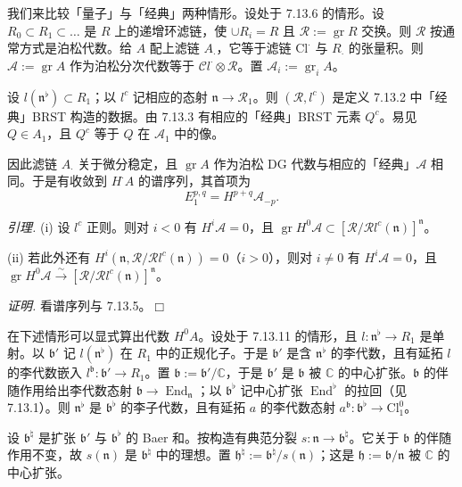  我们来比较「量子」与「经典」两种情形。设处于 7.13.6 的情形。设 $R_0\subset R_1\subset\ldots$ 是 $R$ 上的递增环滤链，使 $\cup R_i=R$ 且 $\mathcal{R}:=\operatorname{gr}R$ 交换。则 $\mathcal{R}$ 按通常方式是泊松代数。给 $A$ 配上滤链 $A_{\cdot}$，它等于滤链 $\mathrm{Cl}^{\cdot}$ 与 $R_{\cdot}$ 的张量积。则 $\mathcal{A}:=\operatorname{gr}A$ 作为泊松分次代数等于 $\mathcal{C}l^{\cdot}\otimes\mathcal{R}$。置 $\mathcal{A}_i:=\operatorname{gr}_iA$。

设 $l(\mathfrak{n}^{\flat})\subset R_1$；以 $l^{c}$ 记相应的态射 $\mathfrak{n}\to\mathcal{R}_1$。则 $(\mathcal{R},l^{c})$ 是定义 7.13.2 中「经典」BRST 构造的数据。由 7.13.3 有相应的「经典」BRST 元素 $Q^{c}$。易见 $Q\in A_1$，且 $Q^{c}$ 等于 $Q$ 在 $\mathcal{A}_1$ 中的像。


因此滤链 $A_{\cdot}$ 关于微分稳定，且 $\operatorname{gr}A$ 作为泊松 DG 代数与相应的「经典」$\mathcal{A}$ 相同。于是有收敛到 $H^{\cdot}A$ 的谱序列，其首项为
\[
E^{p,q}_1=H^{p+q}\mathcal{A}_{-p}.
\]

 \emph{引理.} (i) 设 $l^{c}$ 正则。则对 $i<0$ 有 $H^{i}\mathcal{A}=0$，且 $\operatorname{gr}H^{0}\mathcal{A}\subset[\mathcal{R}/\mathcal{R}l^{c}(\mathfrak{n})]^{\mathfrak{n}}$。

(ii) 若此外还有 $H^{i}(\mathfrak{n},\mathcal{R}/\mathcal{R}l^{c}(\mathfrak{n}))=0$（$i>0$），则对 $i\ne0$ 有 $H^{i}\mathcal{A}=0$，且 $\operatorname{gr}H^{0}\mathcal{A}\xrightarrow{\sim}[\mathcal{R}/\mathcal{R}l^{c}(\mathfrak{n})]^{\mathfrak{n}}$。

\emph{证明.} 看谱序列与 7.13.5。\hfill$\Box$

 在下述情形可以显式算出代数 $H^{0}A$。设处于 7.13.11 的情形，且 $l:\mathfrak{n}^{\flat}\to R_1$ 是单射。以 $\mathfrak{b}'$ 记 $l(\mathfrak{n}^{\flat})$ 在 $R_1$ 中的正规化子。于是 $\mathfrak{b}'$ 是含 $\mathfrak{n}^{\flat}$ 的李代数，且有延拓 $l$ 的李代数嵌入 $l^{\mathfrak{b}}:\mathfrak{b}'\to R_1$。置 $\mathfrak{b}:=\mathfrak{b}'/\mathbb{C}$，于是 $\mathfrak{b}'$ 是 $\mathfrak{b}$ 被 $\mathbb{C}$ 的中心扩张。$\mathfrak{b}$ 的伴随作用给出李代数态射 $\mathfrak{b}\to\operatorname{End}_{\mathfrak{n}}$；以 $\mathfrak{b}^{\flat}$ 记中心扩张 $\operatorname{End}^{\flat}$ 的拉回（见 7.13.1）。则 $\mathfrak{n}^{\flat}$ 是 $\mathfrak{b}^{\flat}$ 的李子代数，且有延拓 $a$ 的李代数态射 $a^{\mathfrak{b}}:\mathfrak{b}^{\flat}\to\mathrm{Cl}^{0}_1$。

设 $\mathfrak{b}^{\natural}$ 是扩张 $\mathfrak{b}'$ 与 $\mathfrak{b}^{\flat}$ 的 Baer 和。按构造有典范分裂 $s:\mathfrak{n}\to\mathfrak{b}^{\natural}$。它关于 $\mathfrak{b}$ 的伴随作用不变，故 $s(\mathfrak{n})$ 是 $\mathfrak{b}^{\natural}$ 中的理想。置 $\mathfrak{h}^{\natural}:=\mathfrak{b}^{\natural}/s(\mathfrak{n})$；这是 $\mathfrak{h}:=\mathfrak{b}/\mathfrak{n}$ 被 $\mathbb{C}$ 的中心扩张。


